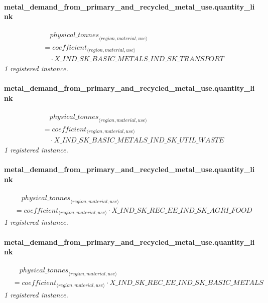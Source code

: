 \documentclass[11pt]{article}
\begin{document}
\paragraph{metal\_demand\_from\_primary\_and\_recycled\_metal\_use.quantity\_link}
\begin{align*}
&\quad {physical\_tonnes}_{\langle region, material, use\rangle}\\
&= coefficient_{\langle region, material, use\rangle}\\
&\quad {}\cdot X\_IND\_SK\_BASIC\_METALS\_IND\_SK\_TRANSPORT
\end{align*}
\noindent\emph{1 registered instance.}\par
\paragraph{metal\_demand\_from\_primary\_and\_recycled\_metal\_use.quantity\_link}
\begin{align*}
&\quad {physical\_tonnes}_{\langle region, material, use\rangle}\\
&= coefficient_{\langle region, material, use\rangle}\\
&\quad {}\cdot X\_IND\_SK\_BASIC\_METALS\_IND\_SK\_UTIL\_WASTE
\end{align*}
\noindent\emph{1 registered instance.}\par
\paragraph{metal\_demand\_from\_primary\_and\_recycled\_metal\_use.quantity\_link}
\begin{align*}
&\quad {physical\_tonnes}_{\langle region, material, use\rangle}\\
&= coefficient_{\langle region, material, use\rangle} \cdot X\_IND\_SK\_REC\_EE\_IND\_SK\_AGRI\_FOOD
\end{align*}
\noindent\emph{1 registered instance.}\par
\paragraph{metal\_demand\_from\_primary\_and\_recycled\_metal\_use.quantity\_link}
\begin{align*}
&\quad {physical\_tonnes}_{\langle region, material, use\rangle}\\
&= coefficient_{\langle region, material, use\rangle} \cdot X\_IND\_SK\_REC\_EE\_IND\_SK\_BASIC\_METALS
\end{align*}
\noindent\emph{1 registered instance.}\par
\end{document}
